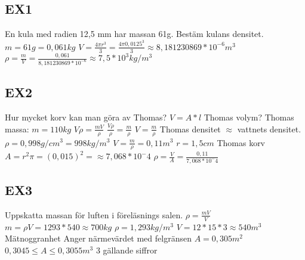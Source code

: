 \documentclass[a4paper,11pt]{article}
\begin{document}
\begin{flushleft}
\subsection{EX1}
En kula med radien 12,5 mm har massan 61g.\newline
Bestäm kulans densitet.\newline
$ m = 61g = 0,061 kg $\newline
$ V = \frac{4\pi r^3}{3} = \frac{4\pi 0,0125^3}{3} \approx 8,181230869*10^{-6} m^3 $\newline
$ \rho = \frac{m}{V} = \frac{0,061}{8,181230869*10^{-6}} \approx 7,5*10^3 kg/m^3 $\newline
\newline
\subsection{EX2}
Hur mycket korv kan man göra av Thomas?\newline
$ V = A*l $\newline
Thomas volym?\newline
Thomas massa: $ m=110kg $\newline
$ V \rho = \frac{mV}{\rho} $\newline
$ \frac{V\rho}{\rho} = \frac{m}{\rho} $\newline
$ V = \frac{m}{\rho} $ \newline
Thomas densitet $ \approx $ vattnets densitet.\newline
$ \rho = 0,998 g/cm^3 = 998 kg/m^3 $\newline
$ V= \frac{m}{\rho} = 0,11 m^3 $\newline
$ r = 1,5 cm $ Thomas korv\newline
$ A = r^2 \pi = (0,015)^2 =\approx 7,068*10^-4 $\newline
$ \rho = \frac{V}{A} = \frac{0,11}{7,068*10^-4} $\newline
\newline
\subsection{EX3}
Uppskatta massan för luften i föreläsnings salen.\newline
$ \rho = \frac{m V}{V} $\newline
$ m = \rho V = 1293 * 540 \approx 700 kg $\newline
$ \rho = 1,293 kg/m^3 $\newline
$ V = 12 * 15 * 3  \approx 540 m^3 $
Mätnoggranhet\newline
Anger närmevärdet med felgränsen\newline
$ A = 0,305 m^2 $\newline
$ 0,3045 \leqslant  A \leqslant  0,3055 m^3 $ 3 gällande siffror\newline
\newpage

\end{flushleft}
\end{document}
